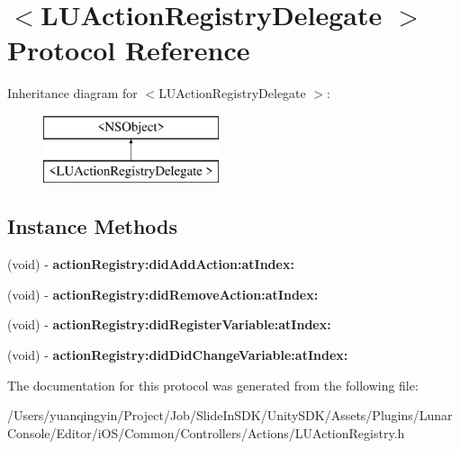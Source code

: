 \hypertarget{protocol_l_u_action_registry_delegate_01-p}{}\section{$<$L\+U\+Action\+Registry\+Delegate $>$ Protocol Reference}
\label{protocol_l_u_action_registry_delegate_01-p}
Inheritance diagram for $<$L\+U\+Action\+Registry\+Delegate $>$\+:\begin{figure}[H]
\begin{center}
\leavevmode
\includegraphics[height=2.000000cm]{protocol_l_u_action_registry_delegate_01-p}
\end{center}
\end{figure}
\subsection*{Instance Methods}
\begin{DoxyCompactItemize}
\item 
\mbox{\label{protocol_l_u_action_registry_delegate_01-p_af840919ed6810f5d3fd406b23b2b5ede}} 
(void) -\/ {\bfseries action\+Registry\+:did\+Add\+Action\+:at\+Index\+:}
\item 
\mbox{\label{protocol_l_u_action_registry_delegate_01-p_a48abd5d7500155bc5978b32feb9e9d2f}} 
(void) -\/ {\bfseries action\+Registry\+:did\+Remove\+Action\+:at\+Index\+:}
\item 
\mbox{\label{protocol_l_u_action_registry_delegate_01-p_aa104ffbceb7ceb2d606eb57f54ca5a6f}} 
(void) -\/ {\bfseries action\+Registry\+:did\+Register\+Variable\+:at\+Index\+:}
\item 
\mbox{\label{protocol_l_u_action_registry_delegate_01-p_aa5c03d1184ba28ee847e778faf94b1e7}} 
(void) -\/ {\bfseries action\+Registry\+:did\+Did\+Change\+Variable\+:at\+Index\+:}
\end{DoxyCompactItemize}


The documentation for this protocol was generated from the following file\+:\begin{DoxyCompactItemize}
\item 
/\+Users/yuanqingyin/\+Project/\+Job/\+Slide\+In\+S\+D\+K/\+Unity\+S\+D\+K/\+Assets/\+Plugins/\+Lunar\+Console/\+Editor/i\+O\+S/\+Common/\+Controllers/\+Actions/L\+U\+Action\+Registry.\+h\end{DoxyCompactItemize}

